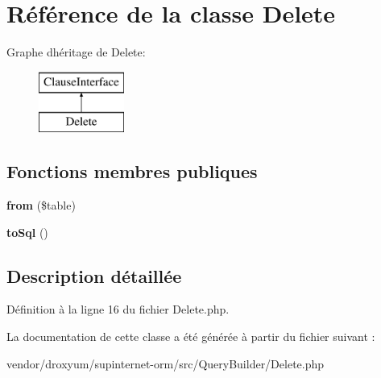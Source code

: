 \hypertarget{class_o_r_m_1_1_query_builder_1_1_delete}{}\section{Référence de la classe Delete}
\label{class_o_r_m_1_1_query_builder_1_1_delete}
Graphe d\textquotesingle{}héritage de Delete\+:\begin{figure}[H]
\begin{center}
\leavevmode
\includegraphics[height=2.000000cm]{class_o_r_m_1_1_query_builder_1_1_delete}
\end{center}
\end{figure}
\subsection*{Fonctions membres publiques}
\begin{DoxyCompactItemize}
\item 
{\bfseries from} (\$table)\hypertarget{class_o_r_m_1_1_query_builder_1_1_delete_ac13b3019b235987db688007a12422882}{}\label{class_o_r_m_1_1_query_builder_1_1_delete_ac13b3019b235987db688007a12422882}

\item 
{\bfseries to\+Sql} ()\hypertarget{class_o_r_m_1_1_query_builder_1_1_delete_a63f8ba861f1ecabe359d454fde60d395}{}\label{class_o_r_m_1_1_query_builder_1_1_delete_a63f8ba861f1ecabe359d454fde60d395}

\end{DoxyCompactItemize}


\subsection{Description détaillée}


Définition à la ligne 16 du fichier Delete.\+php.



La documentation de cette classe a été générée à partir du fichier suivant \+:\begin{DoxyCompactItemize}
\item 
vendor/droxyum/supinternet-\/orm/src/\+Query\+Builder/Delete.\+php\end{DoxyCompactItemize}
